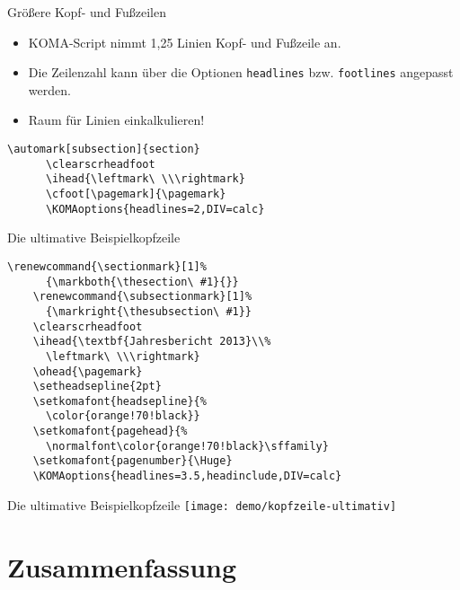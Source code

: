 \begin{Frame}[fragile]{Größere Kopf- und Fußzeilen}
  \begin{itemize}
    \item KOMA-Script nimmt 1,25 Linien Kopf- und Fußzeile an.
    \item Die Zeilenzahl kann über die Optionen \lstinline-headlines-
      bzw. \lstinline-footlines- angepasst werden.
    \item Raum für Linien einkalkulieren!
  \end{itemize}

  \xxx

  \begin{Beispiel}
    \begin{lstlisting}[gobble=6,style=block]
      \automark[subsection]{section}
      \clearscrheadfoot
      \ihead{\leftmark\ \\\rightmark}
      \cfoot[\pagemark]{\pagemark}
      \KOMAoptions{headlines=2,DIV=calc}
    \end{lstlisting}
  \end{Beispiel}
\end{Frame}

\begin{Frame}[fragile]{Die ultimative Beispielkopfzeile}
  \begin{lstlisting}[gobble=4]
    \renewcommand{\sectionmark}[1]%
      {\markboth{\thesection\ #1}{}}
    \renewcommand{\subsectionmark}[1]%
      {\markright{\thesubsection\ #1}}
    \clearscrheadfoot
    \ihead{\textbf{Jahresbericht 2013}\\%
      \leftmark\ \\\rightmark}
    \ohead{\pagemark}
    \setheadsepline{2pt}
    \setkomafont{headsepline}{%
      \color{orange!70!black}}
    \setkomafont{pagehead}{%
      \normalfont\color{orange!70!black}\sffamily}
    \setkomafont{pagenumber}{\Huge}
    \KOMAoptions{headlines=3.5,headinclude,DIV=calc}
  \end{lstlisting}
\end{Frame}

\begin{Frame}{Die ultimative Beispielkopfzeile}
  \texttt{[image: demo/kopfzeile-ultimativ]}
\end{Frame}

\malte

\section*{Zusammenfassung}


